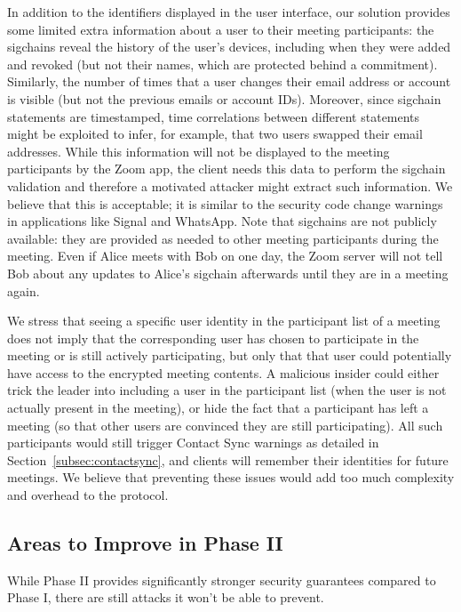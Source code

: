 In addition to the identifiers displayed in the user interface, our solution provides some limited
extra information about a user to their
meeting participants: the sigchains reveal the history of the user's devices, including when they
were added and revoked (but not their names, which are protected behind a commitment). Similarly,
the number of times that a user changes their email address or account is visible (but not the
previous emails or account IDs). Moreover, since sigchain statements are timestamped, time
correlations between different statements might be exploited to infer, for example, that two users
swapped their email addresses. While this information will not be displayed to the meeting
participants by the Zoom app, the client needs this data to perform the sigchain validation and
therefore a motivated attacker might extract such information. We believe that this is acceptable;
it is similar to the security code change warnings in applications like
Signal and WhatsApp. Note that sigchains are not publicly available: they are provided as needed to other meeting participants during the meeting. Even if Alice meets with Bob on one day, the Zoom server will not tell Bob about any updates to Alice's sigchain afterwards until they are in a meeting again.

We stress that seeing a specific user identity in the participant list of a meeting does not imply
that the corresponding user has chosen to participate in the meeting or is still actively
participating, but only that that user could potentially have access to the encrypted meeting
contents. A malicious insider could either trick the leader into including a user in the participant
list (when the user is not actually present in the meeting), or hide the fact that a participant has
left a meeting (so that other users are convinced they are still participating). All such
participants would still trigger Contact Sync warnings as detailed in
Section~\ref{subsec:contactsync}, and clients will remember their identities for future meetings. We
believe that preventing these issues would add too much complexity and overhead to the protocol.

\subsection{Areas to Improve in Phase II}

While Phase II provides significantly stronger security guarantees compared to Phase I, there are
still attacks it won't be able to prevent.

